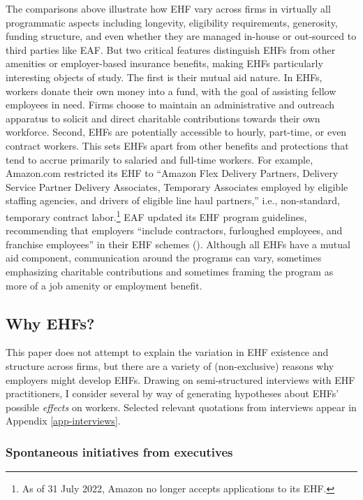 \documentclass[
  11pt,
  oneside]{article}
\begin{document}
The comparisons above illustrate how EHF vary across firms in virtually all programmatic aspects including longevity, eligibility requirements, generosity, funding structure, and even whether they are managed in-house or out-sourced to third parties like EAF. But two critical features distinguish EHFs from other amenities or employer-based insurance benefits, making EHFs particularly interesting objects of study. The first is their mutual aid nature. In EHFs, workers donate their own money into a fund, with the goal of assisting fellow employees in need. Firms choose to maintain an administrative and outreach apparatus to solicit and direct charitable contributions towards their own workforce. Second, EHFs are potentially accessible to hourly, part-time, or even contract workers. This sets EHFs apart from other benefits and protections that tend to accrue primarily to salaried and full-time workers. For example, Amazon.com restricted its EHF to ``Amazon Flex Delivery Partners, Delivery Service Partner Delivery Associates, Temporary Associates employed by eligible staffing agencies, and drivers of eligible line haul partners,'' i.e., non-standard, temporary contract labor.\footnote{As of 31 July 2022, Amazon no longer accepts applications to its EHF.} EAF updated its EHF program guidelines, recommending that employers ``include contractors, furloughed employees, and franchise employees'' in their EHF schemes (). Although all EHFs have a mutual aid component, communication around the programs can vary, sometimes emphasizing charitable contributions and sometimes framing the program as more of a job amenity or employment benefit.

\subsection{Why EHFs?}\label{why-ehfs}

This paper does not attempt to explain the variation in EHF existence and structure across firms, but there are a variety of (non-exclusive) reasons why employers might develop EHFs. Drawing on semi-structured interviews with EHF practitioners, I consider several by way of generating hypotheses about EHFs' possible \emph{effects} on workers. Selected relevant quotations from interviews appear in Appendix \ref{app-interviews}.

\subsubsection{Spontaneous initiatives from executives}\label{spontaneous-initiatives-from-executives}
\end{document}
